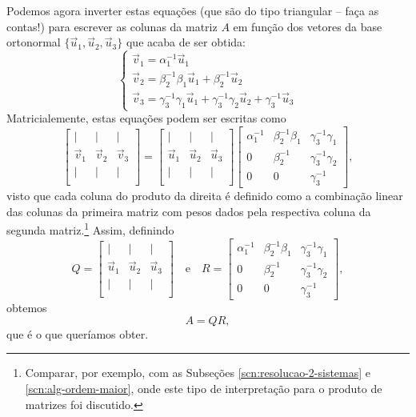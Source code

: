 Podemos agora inverter estas equações (que são do tipo triangular -- faça as contas!) para escrever as colunas da matriz $A$ em função dos vetores da base ortonormal $\{\vec{u}_1, \vec{u}_2, \vec{u}_3\}$ que acaba de ser obtida:
\begin{equation}
\begin{cases}
\vec{v}_1 = \alpha_1^{-1}\vec{u}_1 \\
\vec{v}_2 = \beta_2^{-1}\beta_1 \vec{u}_1 + \beta_2^{-1} \vec{u}_2 \\
\vec{v}_3 =  \gamma_3^{-1}\gamma_1 \vec{u}_1 +  \gamma_3^{-1}\gamma_2 \vec{u}_2 + \gamma_3^{-1} \vec{u}_3
\end{cases}
\end{equation} Matricialemente, estas equações podem ser escritas como
\begin{equation}
\begin{bmatrix}
| & | & | \\
\vec{v}_1  & \vec{v}_2 & \vec{v}_3\\
| & | & | \\
\end{bmatrix} =
\begin{bmatrix}
| & | & | \\
\vec{u}_1  & \vec{u}_2 & \vec{u}_3 \\
| & | & | \\
\end{bmatrix}
\begin{bmatrix}
\alpha_1^{-1}  & \beta_2^{-1}\beta_1  & \gamma_3^{-1}\gamma_1 \\
0 & \beta_2^{-1} & \gamma_3^{-1}\gamma_2 \\
0 & 0 & \gamma_3^{-1}
\end{bmatrix},
\end{equation} visto que cada coluna do produto da direita é definido como a combinação linear das colunas da primeira matriz com pesos dados pela respectiva coluna da segunda matriz.\footnote{Comparar, por exemplo, com as Subseções \ref{scn:resolucao-2-sistemas} e \ref{scn:alg-ordem-maior}, onde este tipo de interpretação para o produto de matrizes foi discutido.}
Assim, definindo
\begin{equation}
Q=\begin{bmatrix}
| & | & | \\
\vec{u}_1 & \vec{u}_2 & \vec{u}_3 \\
| & | & | \\
\end{bmatrix} \quad \text{e} \quad
R =
\begin{bmatrix}
\alpha_1^{-1}  & \beta_2^{-1}\beta_1  & \gamma_3^{-1}\gamma_1 \\
0 & \beta_2^{-1} & \gamma_3^{-1}\gamma_2 \\
0 & 0 & \gamma_3^{-1}
\end{bmatrix},
\end{equation} obtemos
\begin{equation}
A=QR,
\end{equation} que é o que queríamos obter.

